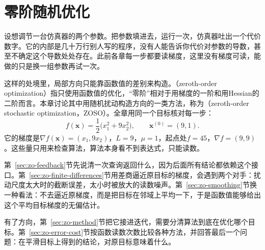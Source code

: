 \chapter{零阶随机优化}
\label{chap:zeroth-order-optimization}

设想调节一台仿真器的两个参数。把参数填进去，运行一次，仿真器吐出一个代价数字。它的内部是几十万行别人写的程序，没有人能告诉你代价对参数的导数，甚至不确定这个导数处处存在。此前各章每一步都要读梯度，这里没有梯度可读，能做的只是换一组参数再试一次。

这样的处境里，局部方向只能靠函数值的差别来构造。（zeroth-order optimization）指只使用函数值的优化，“零阶”相对于用梯度的一阶和用Hessian的二阶而言。本章讨论其中用随机扰动构造方向的一类方法，称为（zeroth-order stochastic optimization，ZOSO）。全章用同一个目标核对每一步：
\begin{equation}
 f(\bm{x})=\frac12\bigl(x_1^2+9x_2^2\bigr),\qquad
 \bm{x}^{(0)}=(9,1).
 \label{eq:zo-example}
\end{equation}
它的梯度是$\nabla f(\bm{x})=(x_1,9x_2)$，$L=9$，$\mu=1$，起点处$f=45$，$\nabla f=(9,9)$。这些量只用来检查算法，算法本身看不到表达式，只能读数。

第~\ref{sec:zo-feedback}节先说清一次查询返回什么，因为后面所有结论都依赖这个接口。第~\ref{sec:zo-finite-differences}节用差商逼近原目标的梯度，会遇到两个对手：扰动尺度太大时的截断误差，太小时被放大的读数噪声。第~\ref{sec:zo-smoothing}节换一种看法：不去逼近原梯度，而是把目标在邻域上平均一下，于是函数值能够给出这个平均目标梯度的无偏估计。

有了方向，第~\ref{sec:zo-method}节把它接进迭代，需要分清算法到底在优化哪个目标。第~\ref{sec:zo-error-cost}节按函数读数次数比较各种方法，并回答最后一个问题：在平滑目标上得到的结论，对原目标意味着什么。







